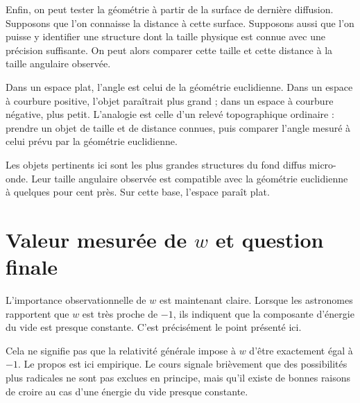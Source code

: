 Enfin, on peut tester la géométrie à partir de la surface de dernière diffusion. Supposons que l’on connaisse la distance à cette surface. Supposons aussi que l’on puisse y identifier une structure dont la taille physique est connue avec une précision suffisante. On peut alors comparer cette taille et cette distance à la taille angulaire observée.

Dans un espace plat, l’angle est celui de la géométrie euclidienne. Dans un espace à courbure positive, l’objet paraîtrait plus grand ; dans un espace à courbure négative, plus petit. L’analogie est celle d’un relevé topographique ordinaire : prendre un objet de taille et de distance connues, puis comparer l’angle mesuré à celui prévu par la géométrie euclidienne.

\begin{classroomqa}\end{classroomqa}

Les objets pertinents ici sont les plus grandes structures du fond diffus micro-onde. Leur taille angulaire observée est compatible avec la géométrie euclidienne à quelques pour cent près. Sur cette base, l’espace paraît plat.

\section{Valeur mesurée de \(w\) et question finale}

L’importance observationnelle de \(w\) est maintenant claire. Lorsque les astronomes rapportent que \(w\) est très proche de \(-1\), ils indiquent que la composante d’énergie du vide est presque constante. C’est précisément le point présenté ici.

Cela ne signifie pas que la relativité générale impose à \(w\) d’être exactement égal à \(-1\). Le propos est ici empirique. Le cours signale brièvement que des possibilités plus radicales ne sont pas exclues en principe, mais qu’il existe de bonnes raisons de croire au cas d’une énergie du vide presque constante.

\begin{classroomqa}\end{classroomqa}